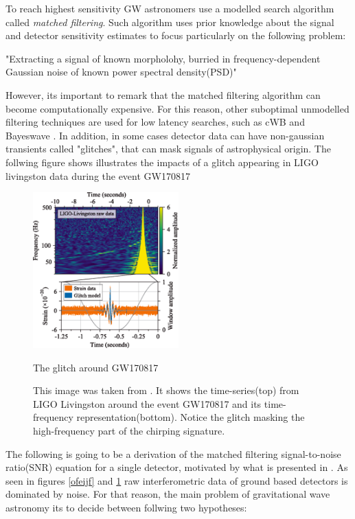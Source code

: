 To reach highest sensitivity GW astronomers use a modelled search algorithm called \textit{matched filtering}. Such algorithm uses prior knowledge about the signal and detector sensitivity estimates to focus particularly on the following problem:

"Extracting a signal of known morpholohy, burried in frequency-dependent Gaussian noise of known power spectral density(PSD)"

However, its important to remark that the matched filtering algorithm can become computationally expensive. For this reason, other suboptimal unmodelled filtering techniques are used for low latency searches, such as cWB and Bayeswave \cite{Drago:2020kic, Cornish:2014kda}. In addition, in some cases detector data can have non-gaussian transients called "glitches", that can mask signals of astrophysical origin. The follwing figure shows illustrates the impacts of a glitch appearing in LIGO livingston data during the event GW170817
 

\begin{figure}[hbt!]
\begin{center}
\includegraphics[width=0.5\textwidth, angle=0]{images/170817.png}
\captionsetup{width=0.8\textwidth}
\caption{The glitch around GW170817}
\caption*{This image was taken from \cite{LIGOScientific:2017vwq}. It shows the time-series(top) from LIGO Livingston around the event GW170817 and its time-frequency representation(bottom). Notice the glitch masking the high-frequency part of the chirping signature.}
\label{ijenfo}
\end{center}
\end{figure}

\FloatBarrier

The following is going to be a derivation of the matched filtering signal-to-noise ratio(SNR) equation for a single detector, motivated by what is presented in \cite{Sathyaprakash:2009xs,Creighton:2011zz,Maggiore:2007ulw,Saulson:1995zi}. As seen in figures \ref{ofeijf} and \ref{ijenfo} raw interferometric data of ground based detectors is dominated by noise. For that reason, the main problem of gravitational wave astronomy its to decide between follwing two hypotheses:

